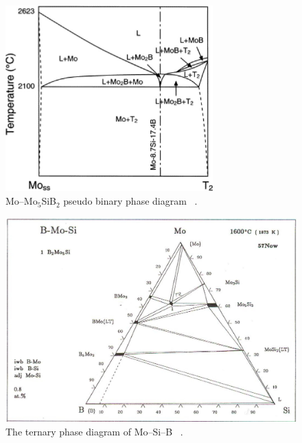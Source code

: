 \vspace{-.2cm}
%
\begin{figure}[H]
\begin{center}
\includegraphics[width=8cm]{Mo-Mo5SiB2}
\caption{Mo--Mo$_5$SiB$_2$ pseudo binary phase diagram ~\cite{yoshimi03}.}
\label{fig:Mo-Mo5SiB2}
\end{center}
\end{figure}
%
\begin{figure}[H]
\begin{center}
\includegraphics[width=\textwidth]{MoSiB_1600}
\caption{The ternary phase diagram of Mo--Si--B ~\cite{nowotny57}.}
\label{fig:MoSiB_1600}
\end{center}
\end{figure}
%
